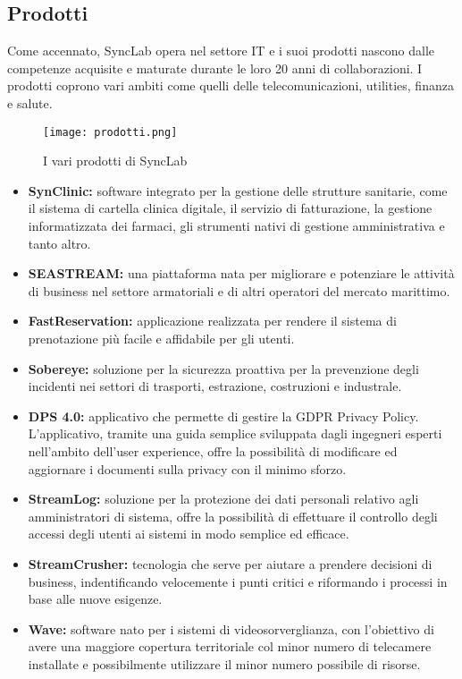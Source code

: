 \subsection{Prodotti}
Come accennato, SyncLab opera nel settore IT e i suoi prodotti nascono dalle competenze acquisite e maturate durante le loro 20 anni di collaborazioni. I prodotti coprono vari ambiti come quelli delle telecomunicazioni, utilities, finanza e salute.
\begin{figure}[H]
    \centering
    \texttt{[image: prodotti.png]}
    \caption{I vari prodotti di SyncLab}
\end{figure}
\begin{itemize}
    \item \textbf{SynClinic:} software integrato per la gestione delle strutture sanitarie, come il sistema di cartella clinica digitale, il servizio di fatturazione, la gestione informatizzata dei farmaci, gli strumenti nativi di gestione amministrativa e tanto altro.
    \item \textbf{SEASTREAM:} una piattaforma nata per migliorare e potenziare le attività di business nel settore armatoriali e di altri operatori del mercato marittimo.
    \item \textbf{FastReservation:} applicazione realizzata per rendere il sistema di prenotazione più facile e affidabile per gli utenti.
    \item \textbf{Sobereye:} soluzione per la sicurezza proattiva per la prevenzione degli incidenti nei settori di trasporti, estrazione, costruzioni e industrale.
    \item \textbf{DPS 4.0:} applicativo che permette di gestire la GDPR Privacy Policy. L'applicativo, tramite una guida semplice sviluppata dagli ingegneri esperti nell'ambito dell'user experience, offre la possibilità di modificare ed aggiornare i documenti sulla privacy con il minimo sforzo.
    \item \textbf{StreamLog:} soluzione per la protezione dei dati personali relativo agli amministratori di sistema, offre la possibilità di effettuare il controllo degli accessi degli utenti ai sistemi in modo semplice ed efficace.
    \item \textbf{StreamCrusher:} tecnologia che serve per aiutare a prendere decisioni di business, indentificando velocemente i punti critici e riformando i processi in base alle nuove esigenze.
    \item \textbf{Wave:} software nato per i sistemi di videosorverglianza, con l'obiettivo di avere una maggiore copertura territoriale col minor numero di telecamere installate e possibilmente utilizzare il minor numero possibile di risorse.
\end{itemize}

